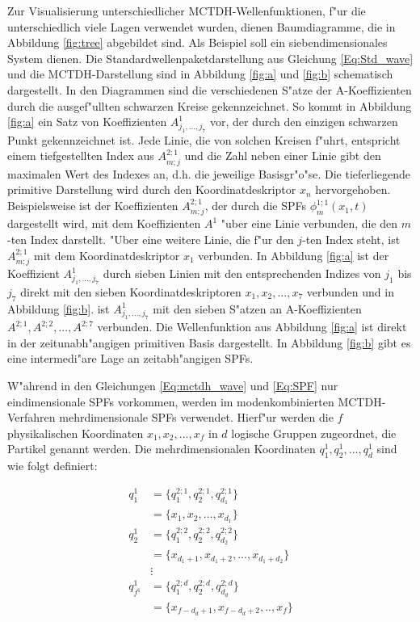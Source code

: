 Zur Visualisierung unterschiedlicher MCTDH-Wellenfunktionen, f"ur die unterschiedlich viele Lagen verwendet wurden, dienen Baumdiagramme,
die in Abbildung \ref{fig:tree} abgebildet sind.
Als Beispiel soll ein siebendimensionales System dienen.
Die Standardwellenpaketdarstellung aus Glei\-chung \ref{Eq:Std_wave} und die MCTDH-Darstellung sind in Abbildung \ref{fig:a} und \ref{fig:b} schematisch dargestellt.
In den Diagrammen sind die verschiedenen S"atze der A-Koeffizienten durch die ausgef"ullten schwarzen Kreise gekennzei\-chnet.
So kommt in Abbildung \ref{fig:a} ein Satz von Koeffizienten $A^{1}_{j_{1}, ..., j_{7}}$ vor, der durch den
einzigen schwarzen Punkt gekennzei\-chnet ist. 
Jede Linie, die von solchen Kreisen f"uhrt, entspricht einem tiefgestellten Index aus $ A^{2;1}_{m;j} $ und die Zahl neben einer Linie gibt den maximalen
Wert des Indexes an, d.h. die jeweilige Basisgr"o"se. Die tieferliegende primitive Darstellung wird durch den Koordinatdeskriptor $x_n$ hervorgehoben.
Beispielsweise ist der Koeffizienten $A^{2;1}_{m;j}$, der durch die SPFs $ \phi^{1;1}_{m} (x_{1}, t) $ dargestellt wird, mit dem 
Koeffizienten $A^1$ "uber eine Linie verbunden, die den $m$-ten Index darstellt. "Uber eine weitere Linie, die f"ur den $j$-ten Index steht,
ist  $A^{2;1}_{m;j}$ mit dem Koordinatdeskriptor $x_1$ verbunden.
In Abbildung \ref{fig:a} ist der Koeffizient $A^{1}_{j_{1}, ..., j_{7}}$  durch sieben Linien mit den entsprechenden Indizes von 
$j_1$ bis $j_7$ direkt mit den sieben Koordinatdeskriptoren $x_1,x_2,...,x_7$ verbunden und in Abbildung \ref{fig:b}. ist $A^{1}_{j_{1}, ..., j_{7}}$
mit den sieben S"atzen an A-Koeffizienten $A^{2;1},A^{2;2},...,A^{2;7}$ verbunden.
Die Wellenfunktion aus Abbildung \ref{fig:a} ist direkt 
in der zeitunabh"angigen primitiven Basis dargestellt. In Abbildung \ref{fig:b} gibt es eine intermedi"are Lage an zeitabh"angigen SPFs. 

W"ahrend in den Gleichungen \ref{Eq:mctdh_wave} und \ref{Eq:SPF} nur eindimensionale SPFs vorkommen, werden im modenkombinierten MCTDH-Verfahren
mehrdimensionale SPFs verwendet. 
Hier\-f"ur werden die $f$ physikalischen Koordinaten $x_{1}, x_{2}, ..., x_{f}$  in $d$ logische Gruppen zugeordnet, die Partikel genannt werden.
Die mehrdimensionalen Koordinaten $q^{1}_{1}, q^{1}_{2}, ..., q^{1}_{d}$ sind wie folgt definiert:


\begin{align*}
  q^{1}_{1} &= \{q^{2;1}_{1},q^{2;1}_{2},q^{2;1}_{d_{1}}\}\\ 
            &= \{x_{1}, x_{2}, ..., x_{d_1}\} \\
  q^{1}_{2} &= \{q^{2;2}_{1},q^{2;2}_{2},q^{2;2}_{d_{2}}\}\\ 
            &= \{x_{d_{1}+1}, x_{d_{1}+2}, ..., x_{d_{1}+d_{2}}\} \\
            &\vdots\\
  q^{1}_{f^1} &= \{q^{2;d}_{1},q^{2;d}_{2},q^{2;d}_{d_{d}}\} \\
            &= \{x_{f-d_d+1},x_{f-d_d+2},..,x_{f}\}
\end{align*}


